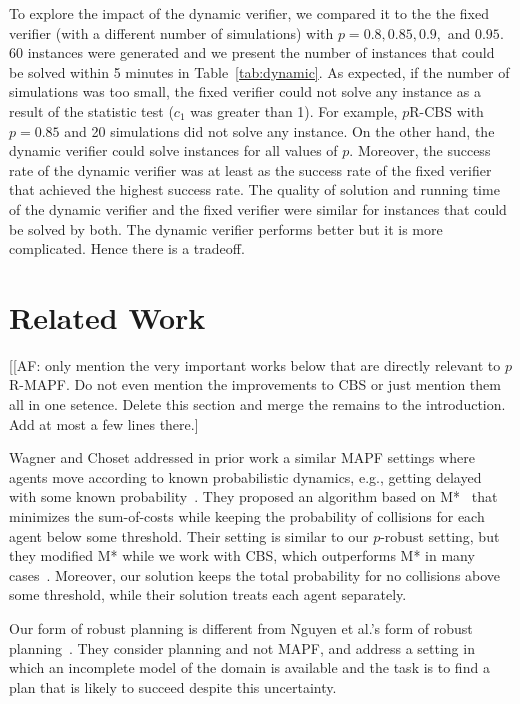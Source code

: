 \documentclass{article}
\newcommand{\prcbs}{$p$R-CBS\xspace}
\newcommand{\prmapf}{$p$R-MAPF\xspace}
\begin{document}
To explore the impact of the dynamic verifier, we compared it to the the fixed verifier (with a different number of simulations) with $p=0.8,0.85,0.9,$ and $0.95$. 60 instances were generated and we present the number of instances that could be solved within 5 minutes in Table~\ref{tab:dynamic}. As expected, if the number of simulations was too small, the fixed verifier could not solve any instance as a result of the statistic test ($c_1$ was greater than 1). For example, \prcbs{} with $p=0.85$ and 20 simulations did not solve any instance. On the other hand, the dynamic verifier could solve instances for all values of $p$. Moreover, the success rate of the dynamic verifier was at least as the success rate of the fixed verifier that achieved the highest success rate. The quality of solution and running time of the dynamic verifier and the fixed verifier were similar for instances that could be solved by both. The dynamic verifier performs better but it is more complicated. Hence there is a tradeoff.


\iffalse
\section{Related Work}

[[AF: only mention the very important works below that are directly relevant to \prmapf. Do not even mention the improvements to CBS or just mention them all in one setence. Delete this section and merge the remains to the introduction. Add at most a few lines there.]

Wagner and Choset addressed in prior work a similar MAPF settings where agents move according to known probabilistic dynamics, e.g., getting delayed with some known probability~\cite{wagner2017path}. They proposed an algorithm based on M*~\cite{wagner2015subdimensional} that minimizes the sum-of-costs while keeping the probability of collisions for each agent below some threshold. 
Their setting is similar to our $p$-robust setting, but they modified M* while we work with CBS, which outperforms M* in many cases~\cite{ICBS}. Moreover, our solution keeps the total probability for no collisions above some threshold, while their solution treats each agent separately.

Our form of robust planning is different from 
Nguyen et al.'s form of robust planning~\cite{nguyen2017robustPlanning}. 
They consider planning and not MAPF, and address a setting in which an incomplete model of the domain is available and the task is to find a plan that is likely to succeed despite this uncertainty. 
\end{document}
